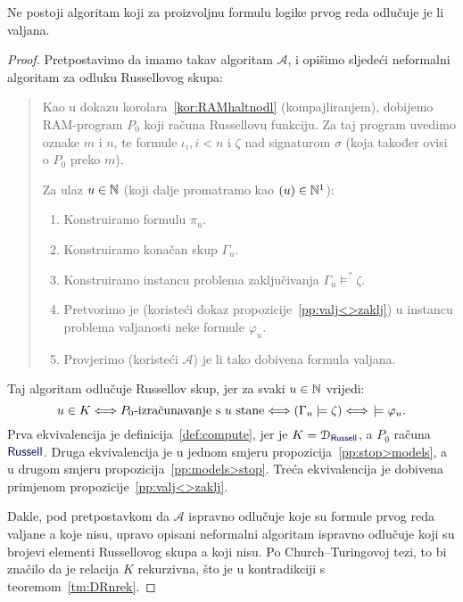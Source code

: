 \begin{teorem}[Church]\label{tm:Church}
Ne postoji algoritam koji za proizvoljnu formulu logike prvog reda odlučuje je li valjana.
\end{teorem}
\begin{proof}
Pretpostavimo da imamo takav algoritam $\mathcal A$, i opišimo sljedeći neformalni algoritam za odluku Russellovog skupa:
\begin{quote}
Kao u dokazu korolara~\ref{kor:RAMhaltnodl} (kompajliranjem), dobijemo RAM-program $P_0$ koji računa Russellovu funkciju. Za taj program uvedimo oznake $m$ i $n$, te formule $\iota_i,i<n$ i $\zeta$ nad signaturom $\sigma$ (koja također ovisi o $P_0$ preko $m$).

Za ulaz $u\in{\mathbb N}$ (koji dalje promatramo kao $(u)\in{\mathbb N}^1$):
\begin{enumerate}
    \item Konstruiramo formulu $\pi_u$.
    \item Konstruiramo konačan skup $\Gamma_u$.
    \item Konstruiramo instancu problema zaključivanja $\Gamma_u%
    \models^?
    \zeta$.
    \item\label{step:varphi_u} Pretvorimo je (koristeći dokaz propozicije~\ref{pp:valj<>zaklj}) u instancu problema valjanosti neke formule $\varphi_u$.
    \item Provjerimo (koristeći $\mathcal A$) je li tako dobivena formula valjana.
\end{enumerate}    
\end{quote}
Taj algoritam odlučuje Russellov skup, jer za svaki $u\in{\mathbb N}$ vrijedi:%
\begin{equation}\label{eq:lanaceqv}
    u\in K\Longleftrightarrow\text{$P_0$-izračunavanje s $u$ stane}\Longleftrightarrow(\Gamma_u\models\zeta)\Longleftrightarrow{}\!\models\varphi_u\text.
\end{equation}
Prva ekvivalencija je definicija~\ref{def:compute}, jer je $K=\dom{\f{Russell}}$, a $P_0$ računa $\f{Russell}$. Druga ekvivalencija je u jednom smjeru propozicija~\ref{pp:stop>models}, a u drugom smjeru propozicija~\ref{pp:models>stop}. Treća ekvivalencija je dobivena primjenom propozicije~\ref{pp:valj<>zaklj}.

Dakle, pod pretpostavkom da $\mathcal A$ ispravno odlučuje koje su formule prvog reda valjane a koje nisu, upravo opisani neformalni algoritam ispravno odlučuje koji su brojevi elementi Russellovog skupa a koji nisu. Po Church--\!Turingovoj tezi, to bi značilo da je relacija $K$ rekurzivna, što je u kontradikciji s teoremom~\ref{tm:DRnrek}.
\end{proof}

